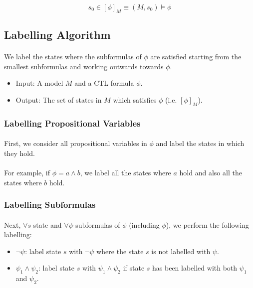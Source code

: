 \documentclass{article}
\theoremstyle{plain}
\theoremstyle{definition}
\begin{document}
\begin{multicols}{2}
$$s_0 \in [\phi]_M \equiv (M, s_0) \models \phi$$

\subsection{Labelling Algorithm}

\paragraph{} We label the states where the subformulas of $\phi$ are satisfied starting from the smallest subformulas and working outwards towards $\phi$. 

\begin{itemize}
\item Input: A model $M$ and a CTL formula $\phi$.
\item Output: The set of states in $M$ which satisfies $\phi$ (i.e. $[\phi]_M$).
\end{itemize}

\subsubsection{Labelling Propositional Variables}

\paragraph{} First, we consider all propositional variables in $\phi$ and label the states in which they hold. 

\paragraph{} For example, if $\phi = a \land b$, we label all the states where $a$ hold and also all the states where $b$ hold.

\subsubsection{Labelling Subformulas}

\paragraph{} Next, $\forall s$ state and $\forall\psi$ subformulas of $\phi$ (including $\phi$), we perform the following labelling:

\begin{itemize}
\item $\lnot\psi$: label state $s$ with $\lnot\psi$ where the state $s$ is not labelled with $\psi$.
\item $\psi_1 \land \psi_2$: label state $s$ with $\psi_1 \land \psi_2$ if state $s$ has been labelled with both $\psi_1$ and $\psi_2$.
\end{itemize}


\end{multicols}
\end{document}

